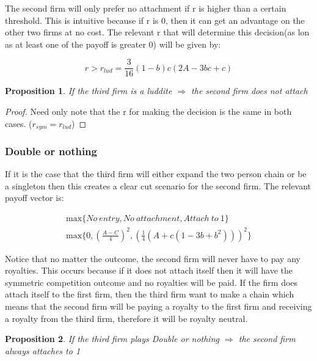 \documentclass{article}
\newtheorem{proposition}{Proposition}
\begin{document}
The second firm will only prefer no attachment if r is higher than a certain threshold. This is intuitive because if r is 0, then it can get an advantage on the other two firms at no cost. The relevant r that will determine this decision(as lon as at least one of the payoff is greater 0) will be given by: 

\begin{equation*}
r> r_{lud} = \frac{3}{16} (1-b) c (2 A-3 b c+c)
\end{equation*}

\begin{proposition} \label{symislud}
If the third firm is a luddite $\Rightarrow$ the second firm does not attach
\end{proposition}

\begin{proof}
Need only note that the r for making the decision is the same in both cases. ($r_{sym}=r_{lud}$)
\end{proof}

\subsubsection{Double or nothing}

If it is the case that the third firm will either expand the two person chain or be a singleton then this creates a clear cut scenario for the second firm. The relevant payoff vector is: 

\begin{align*}
&\text{max} \{No~entry, No~attachment, Attach~to~1 \} &\\
& \text{max} \{ 
0, \left(\frac{A-C}{4} \right)^2, \left(\frac{1}{4}(A+c(1-3b+b^2)) \right)^2
\} &
\end{align*}

Notice that no matter the outcome, the second firm will never have to pay any royalties. This occurs because if it does not attach itself then it will have the symmetric competition outcome and no royalties will be paid. If the firm does attach itself to the first firm, then the third firm want to make a chain which means that the second firm will be paying a royalty to the first firm and receiving a royalty from the third firm, therefore it will be royalty neutral. 

\begin{proposition}
If the third firm plays Double or nothing $\Rightarrow$ the second firm always attaches to 1
\end{proposition}
\end{document}
